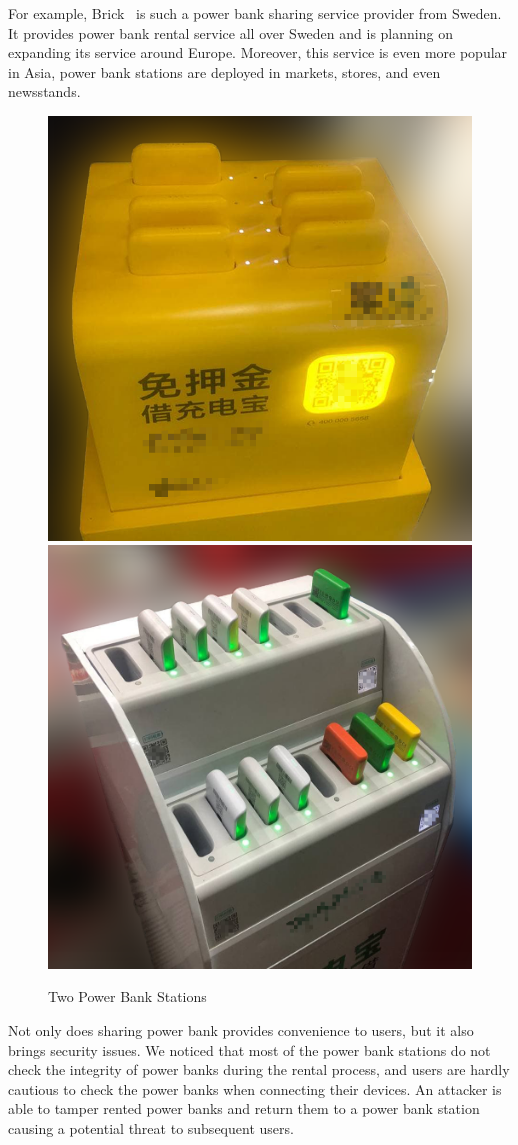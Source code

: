 For example, Brick~\cite{Brick} is such a power bank sharing service
provider from Sweden. It provides power bank rental service all over Sweden
and is planning on expanding its service around Europe. Moreover, this
service is even more popular in Asia, power bank stations are deployed in
markets, stores, and even newsstands.

\begin{figure}[t]
	\centering
	\includegraphics[width=.45 \linewidth, height=.45 \linewidth]{./Figs/PBS_mt.png}
	\includegraphics[width=.45 \linewidth, height=.45 \linewidth]{./Figs/PBS_xd.png}
	\caption{Two Power Bank Stations}
	\label{fig:PBS_products}
\end{figure}



Not only does sharing power bank provides convenience to users, but it also
brings security issues.  We noticed that most of the power bank stations do not
check the integrity of power banks during the rental process, and users are
hardly cautious to check the power banks when connecting their devices.  An
attacker is able to tamper rented power banks and return them to a power bank
station causing a potential threat to subsequent users.


